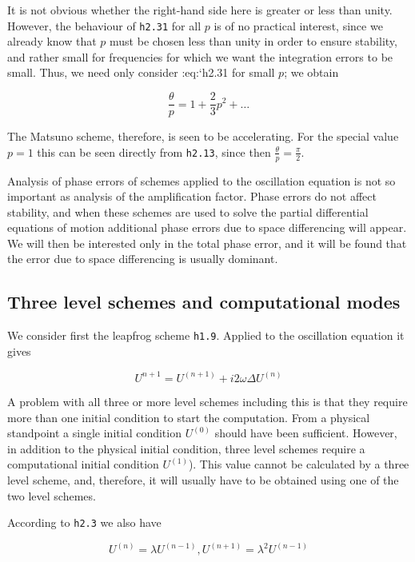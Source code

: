 It is not obvious whether the right-hand side here is greater or less
than unity. However, the behaviour of \texttt{h2.31} for all \(p\) is of
no practical interest, since we already know that $p$ must be chosen
less than unity in order to ensure stability, and rather small for
frequencies for which we want the integration errors to be small. Thus,
we need only consider :eq:`h2.31 for small $p$; we obtain

\[\frac{\theta}{p} = 1 + \frac{2}{3}p^{2} + \ldots\]

The Matsuno scheme, therefore, is seen to be accelerating. For the
special value \(p = 1\) this can be seen directly from \texttt{h2.13},
since then \(\frac{\theta}{p} = \frac{\pi}{2}\).

Analysis of phase errors of schemes applied to the oscillation equation
is not so important as analysis of the amplification factor. Phase
errors do not affect stability, and when these schemes are used to solve
the partial differential equations of motion additional phase errors due
to space differencing will appear. We will then be interested only in
the total phase error, and it will be found that the error due to space
differencing is usually dominant.

\subsection{Three level schemes and computational
modes}\label{subsec:three-level-schemes-and-computational-modes}

We consider first the leapfrog scheme \texttt{h1.9}. Applied to the
oscillation equation it gives

\[U^{n + 1} = U^{( n + 1 )} + i 2\omega\Delta U^{\left( n \right)}\]

A problem with all three or more level schemes including this is that
they require more than one initial condition to start the computation.
From a physical standpoint a single initial condition
\(U^{\left( 0 \right)}\) should have been sufficient. However, in
addition to the physical initial condition, three level schemes require
a computational initial condition \(U^{\left( 1 \right)}\)). This value
cannot be calculated by a three level scheme, and, therefore, it will
usually have to be obtained using one of the two level schemes.

According to \texttt{h2.3} we also have

\[U^{\left( n \right)} = \lambda U^{\left( n - 1 \right)},
U^{\left( n + 1 \right)} = \lambda^{2}U^{\left( n - 1 \right)}\]

